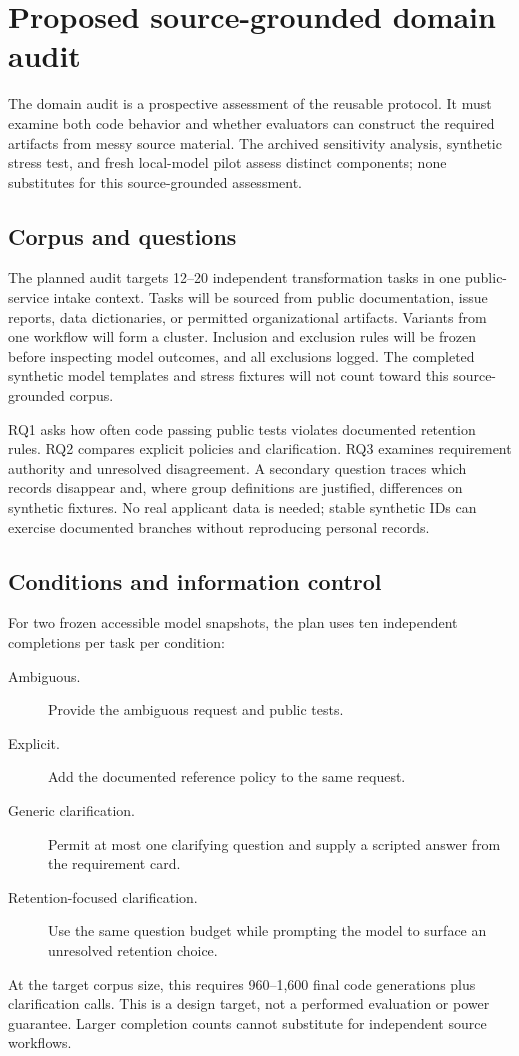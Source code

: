 \documentclass[manuscript,screen,review,anonymous]{acmart}
\begin{document}
\section{Proposed source-grounded domain audit}
The domain audit is a prospective assessment of the reusable protocol. It must examine both code behavior and whether evaluators can construct the required artifacts from messy source material. The archived sensitivity analysis, synthetic stress test, and fresh local-model pilot assess distinct components; none substitutes for this source-grounded assessment.

\subsection{Corpus and questions}
The planned audit targets 12--20 independent transformation tasks in one public-service intake context. Tasks will be sourced from public documentation, issue reports, data dictionaries, or permitted organizational artifacts. Variants from one workflow will form a cluster. Inclusion and exclusion rules will be frozen before inspecting model outcomes, and all exclusions logged. The completed synthetic model templates and stress fixtures will not count toward this source-grounded corpus.

RQ1 asks how often code passing public tests violates documented retention rules. RQ2 compares explicit policies and clarification. RQ3 examines requirement authority and unresolved disagreement. A secondary question traces which records disappear and, where group definitions are justified, differences on synthetic fixtures. No real applicant data is needed; stable synthetic IDs can exercise documented branches without reproducing personal records.

\subsection{Conditions and information control}
For two frozen accessible model snapshots, the plan uses ten independent completions per task per condition:
\begin{description}
\item[Ambiguous.] Provide the ambiguous request and public tests.
\item[Explicit.] Add the documented reference policy to the same request.
\item[Generic clarification.] Permit at most one clarifying question and supply a scripted answer from the requirement card.
\item[Retention-focused clarification.] Use the same question budget while prompting the model to surface an unresolved retention choice.
\end{description}
At the target corpus size, this requires 960--1,600 final code generations plus clarification calls. This is a design target, not a performed evaluation or power guarantee. Larger completion counts cannot substitute for independent source workflows.
\end{document}
